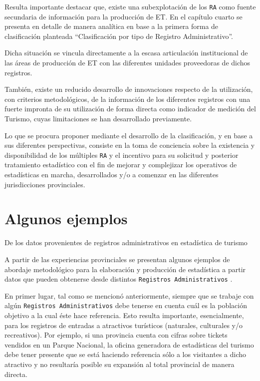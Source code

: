 \documentclass[
]{book}
\begin{document}
Resulta importante destacar que, existe una subexplotación de los \texttt{RA} como fuente secundaria de información para la producción de ET. En el capítulo cuarto se presenta en detalle de manera analítica en base a la primera forma de clasificación planteada ``Clasificación por tipo de Registro Administrativo''.

Dicha situación se vincula directamente a la escasa articulación institucional de las áreas de producción de ET con las diferentes unidades proveedoras de dichos registros.

También, existe un reducido desarrollo de innovaciones respecto de la utilización, con criterios metodológicos, de la información de los diferentes registros con una fuerte impronta de su utilización de forma directa como indicador de medición del Turismo, cuyas limitaciones se han desarrollado previamente.

Lo que se procura proponer mediante el desarrollo de la clasificación, y en base a sus diferentes perspectivas, consiste en la toma de conciencia sobre la existencia y disponibilidad de los múltiples \texttt{RA} y el incentivo para su solicitud y posterior tratamiento estadístico con el fin de mejorar y complejizar los operativos de estadísticas en marcha, desarrollados y/o a comenzar en las diferentes jurisdicciones provinciales.

\hypertarget{algunos-ejemplos}{%
\chapter{\texorpdfstring{\textbf{Algunos ejemplos}}{Algunos ejemplos}}\label{algunos-ejemplos}}

De los datos provenientes de registros administrativos en estadística de turismo

A partir de las experiencias provinciales se presentan algunos ejemplos de abordaje metodológico para la elaboración y producción de estadística a partir datos que pueden obtenerse desde distintos \texttt{Registros\ Administrativos} .

En primer lugar, tal como se mencionó anteriormente, siempre que se trabaje con algún \texttt{Registros\ Administrativos} debe tenerse en cuenta cuál es la población objetivo a la cual éste hace referencia. Esto resulta importante, esencialmente, para los registros de entradas a atractivos turísticos (naturales, culturales y/o recreativos). Por ejemplo, si una provincia cuenta con cifras sobre tickets vendidos en un Parque Nacional, la oficina generadora de estadísticas del turismo debe tener presente que se está haciendo referencia sólo a los visitantes a dicho atractivo y no resultaría posible su expansión al total provincial de manera directa.
\end{document}
